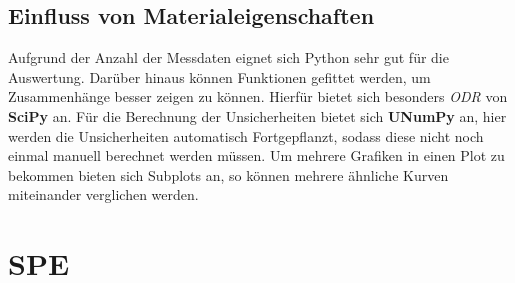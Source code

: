 \documentclass[a4paper,12pt]{article}
\begin{document}
\subsection{Einfluss von Materialeigenschaften}
Aufgrund der Anzahl der Messdaten eignet sich Python sehr gut für die Auswertung. Darüber hinaus können Funktionen gefittet werden, um Zusammenhänge besser zeigen zu können. Hierfür bietet sich besonders \textit{ODR} von \textbf{SciPy} an. \newline
Für die Berechnung der Unsicherheiten bietet sich \textbf{UNumPy} an, hier werden die Unsicherheiten automatisch Fortgepflanzt, sodass diese nicht noch einmal manuell berechnet werden müssen. \newline
Um mehrere Grafiken in einen Plot zu bekommen bieten sich Subplots an, so können mehrere ähnliche Kurven miteinander verglichen werden.



\section{SPE}
\end{document}
